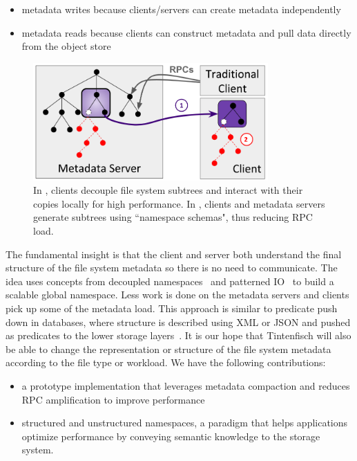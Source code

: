 \begin{itemize}

  \item metadata writes because clients/servers can create metadata
  independently

  \item metadata reads because clients can construct metadata and pull data
  directly from the object store

\end{itemize}

\begin{figure}[t]
  \centering
  \includegraphics[width=90mm]{figures/intro.png}
  \caption{In , clients decouple file system subtrees and interact
with their copies locally for high performance. In , clients and
metadata servers generate subtrees using ``namespace schemas", thus reducing
RPC load.  \label{fig:intro}}
\end{figure}

The fundamental insight is that the client and server both understand the final
structure of the file system metadata so there is no need to communicate.  The
idea uses concepts from decoupled namespaces~\cite{zheng:pdsw2014-batchfs,
zheng:pdsw2015-deltafs} and patterned IO~\cite{he:hpdc13-plfs-patterns} to
build a scalable global namespace. Less work is done on the metadata servers
and clients pick up some of the metadata load.  This approach is similar to
predicate push down in databases, where structure is described using XML or
JSON and pushed as predicates to the lower storage
layers~\cite{shel:pc17-pushdown}. It is our hope that Tintenfisch will also be
able to change the representation or structure of the file system metadata
according to the file type or workload.  We have the following contributions:

\begin{itemize}

  \item a prototype implementation that leverages metadata compaction and
  reduces RPC amplification to improve performance

  \item structured and unstructured namespaces, a paradigm that helps
  applications optimize performance by conveying semantic knowledge to the
  storage system.

\end{itemize}
